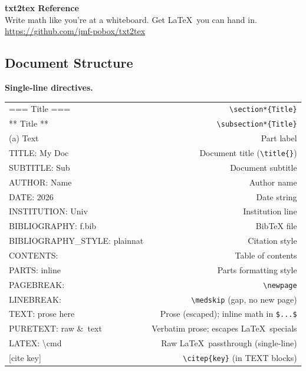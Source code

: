 \documentclass[10pt,landscape,a4paper]{article}
\begin{document}
\begin{center}
{\LARGE\bfseries txt2tex Reference}\\[2pt]
{\small Write math like you're at a whiteboard.  Get \LaTeX\ you can hand in.}\\[1pt]
{\footnotesize\color{gray}\url{https://github.com/jmf-pobox/txt2tex}}
\end{center}

\vspace{-2pt}


\begin{multicols}{2}
\raggedcolumns

\section{Document Structure}

\textbf{Single-line directives.}

\begin{tabularx}{\columnwidth}{LR}
=== Title ===        & \verb|\section*{Title}| \\
** Title **          & \verb|\subsection*{Title}| \\
(a) Text             & Part label \\
TITLE: My Doc        & Document title (\verb|\title{}|) \\
SUBTITLE: Sub        & Document subtitle \\
AUTHOR: Name         & Author name \\
DATE: 2026           & Date string \\
INSTITUTION: Univ    & Institution line \\
BIBLIOGRAPHY: f.bib  & BibTeX file \\
BIBLIOGRAPHY\_STYLE: plainnat & Citation style \\
CONTENTS:            & Table of contents \\
PARTS: inline        & Parts formatting style \\
PAGEBREAK:           & \verb|\newpage| \\
LINEBREAK:           & \verb|\medskip| (gap, no new page) \\
TEXT: prose here     & Prose (escaped); inline math in \verb|$...$| \\
PURETEXT: raw \&\ text & Verbatim prose; escapes \LaTeX\ specials \\
LATEX: \textbackslash cmd & Raw \LaTeX\ passthrough (single-line) \\
{[cite key]}         & \verb|\citep{key}| (in TEXT blocks) \\
\end{tabularx}


\end{multicols}
\end{document}
